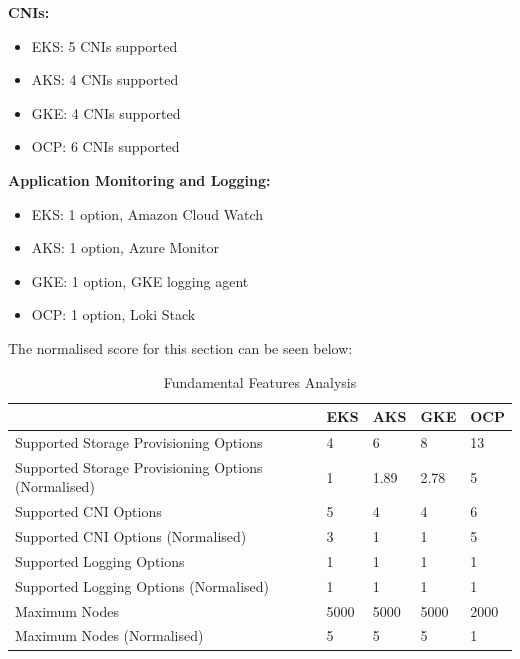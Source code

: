 \textbf{CNIs:}

\begin{itemize}
\tightlist
\item
  EKS: 5 CNIs supported \cite{AlternateCNIPlugins}
\item
  AKS: 4 CNIs supported \cite{schaffererinConceptsCNINetworking2024}
\item
  GKE: 4 CNIs supported \cite{NetworkOverviewGooglea}
\item
  OCP: 6 CNIs supported \cite{CertifiedOpenShiftCNI2024}
\end{itemize}

\textbf{Application Monitoring and Logging:}

\begin{itemize}
\tightlist
\item
  EKS: 1 option, Amazon Cloud Watch \cite{MonitorYourCluster}
\item
  AKS: 1 option, Azure Monitor \cite{martinekuanMonitorMicroservicesApplication}
\item
  GKE: 1 option, GKE logging agent \cite{GKELogsGoogle} 
\item
  OCP: 1 option, Loki Stack \cite{Logging60Logging}
\end{itemize}

The normalised score for this section can be seen below:

\begin{table}[!ht]
    \centering
    \begin{tabular}{|p{4cm}|p{2cm}|p{2cm}|p{2cm}|p{2cm}|} %
    \hline
         & EKS & AKS & GKE & OCP \\ \hline
        Supported Storage Provisioning Options & 4& 6& 8& 13\\ \hline
        Supported Storage Provisioning Options (Normalised)& 1& 1.89& 2.78& 5\\ \hline
        Supported CNI Options& 5& 4& 4& 6\\ \hline
        Supported CNI Options (Normalised)& 3& 1& 1& 5\\ \hline
        Supported Logging Options& 1& 1& 1& 1\\ \hline
 Supported Logging Options (Normalised)& 1& 1& 1&1\\\hline
 Maximum Nodes& 5000& 5000& 5000&2000\\\hline
 Maximum Nodes (Normalised)& 5& 5& 5&1\\\hline
    \end{tabular}
    \caption{Fundamental Features Analysis} 
    \label{tab:cost-analysis}
\end{table}

